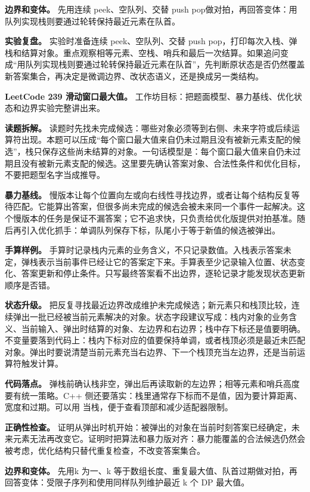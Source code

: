 \textbf{边界和变体。} 先用连续 peek、空队列、交替 push pop做对拍，再回答变体：用队列实现栈则要通过轮转保持最近元素在队首。

\textbf{实验复盘。} 实验时准备连续 peek、空队列、交替 push pop，打印每次入栈、弹栈和结算对象。重点观察相等元素、空栈、哨兵和最后一次结算。如果追问变成“用队列实现栈则要通过轮转保持最近元素在队首”，先判断原状态是否仍然覆盖新答案集合，再决定是微调边界、改状态语义，还是换成另一类结构。

\noindent\textbf{LeetCode 239 滑动窗口最大值。} 工作坊目标：把题面模型、暴力基线、优化状态和边界实验完整讲出来。

\textbf{读题拆解。} 读题时先找未完成候选：哪些对象必须等到右侧、未来字符或后续运算符出现。本题可以压成“每个窗口最大值来自仍未过期且没有被新元素支配的候选”，栈只保存这些尚未结算的对象。一句话模型是：每个窗口最大值来自仍未过期且没有被新元素支配的候选。这里要先确认答案对象、合法性条件和优化目标，不要把题型名字当成推导。

\textbf{暴力基线。} 慢版本让每个位置向左或向右线性寻找边界，或者让每个结构反复等待匹配。它能算出答案，但很多尚未完成的候选会被未来同一个事件一起解决。这个慢版本的任务是保证不漏答案；它不追求快，只负责给优化版提供对拍基准。随后再引入优化抓手：单调队列保存下标，队尾小于等于新值的候选被弹出。

\textbf{手算样例。} 手算时记录栈内元素的业务含义，不只记录数值。入栈表示答案未定，弹栈表示当前事件已经让它的答案定下来。手算表至少记录输入位置、状态变化、答案更新和停止条件。只写最终答案看不出边界，逐轮记录才能发现状态更新顺序是否错。

\textbf{状态升级。} 把反复寻找最近边界改成维护未完成候选；新元素只和栈顶比较，连续弹出一批已经被当前元素解决的对象。状态字段建议写成：栈内对象的业务含义、当前输入、弹出时结算的对象、左边界和右边界；栈中存下标还是值要明确。不变量要落到代码上：栈内下标对应的值要保持单调，或者栈顶必须是最近未匹配对象。弹出时要说清楚当前元素充当右边界、下一个栈顶充当左边界，还是当前运算符触发计算。

\textbf{代码落点。} 弹栈前确认栈非空，弹出后再读取新的左边界；相等元素和哨兵高度要有统一策略。C++ 侧还要落实：栈里通常存下标而不是值，因为要计算距离、宽度和过期。可以用  当栈，便于查看顶部和减少适配器限制。

\textbf{正确性检查。} 证明从弹出时机开始：被弹出的对象在当前时刻答案已经确定，未来元素无法再改变它。证明时把算法和暴力版对齐：暴力能覆盖的合法候选仍然会被考虑，优化结构只替代重复检查，不改变答案集合。

\textbf{边界和变体。} 先用k 为一、k 等于数组长度、重复最大值、队首过期做对拍，再回答变体：受限子序列和使用同样队列维护最近 k 个 DP 最大值。

